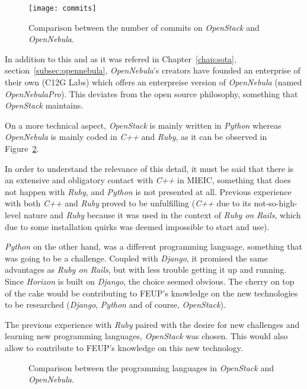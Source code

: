 \begin{figure}[h]
  \begin{center}
    \leavevmode
    \texttt{[image: commits]}
    \caption{Comparison between the number of commits on \textit{OpenStack} and \textit{OpenNebula}.~\cite{ohloh}}
    \label{fig:commits}
  \end{center}
\end{figure}

In addition to this and as it was refered in Chapter~\ref{chap:sota}, section~\ref{subsec:opennebula}, \textit{OpenNebula}'s creators have founded an enterprise of their own (C12G Labs) which offers an enterpreise version of \textit{OpenNebula} (named \textit{OpenNebulaPro}). This deviates from the open source philosophy, something that \textit{OpenStack} maintains.

On a more technical aspect, \textit{OpenStack} is mainly written in \textit{Python} whereas \textit{OpenNebula} is mainly coded in \textit{C++} and \textit{Ruby}, as it can be observed in Figure~\ref{fig:code-stack-nebula}. 

In order to understand the relevance of this detail, it must be said that there is an extensive and obligatory contact with \textit{C++} in MIEIC, something that does not happen with \textit{Ruby}, and \textit{Python} is not presented at all. Previous experience with both \textit{C++} and \textit{Ruby} proved to be unfulfilling (\textit{C++} due to its not-so-high-level nature and \textit{Ruby} because it was used in the context of \textit{Ruby on Rails}, which due to some installation quirks was deemed impossible to start and use). 

\textit{Python} on the other hand, was a different programming language, something that was going to be a challenge. Coupled with \textit{Django}, it promised the same advantages as \textit{Ruby on Rails}, but with less trouble getting it up and running. Since \textit{Horizon} is built on \textit{Django}, the choice seemed obvious. The cherry on top of the cake would be contributing to FEUP's knowledge on the new technologies to be researched (\textit{Django}, \textit{Python} and of course, \textit{OpenStack}).

The previous experience with \textit{Ruby} paired with the desire for new challenges and learning new programming languages, \textit{OpenStack} was chosen. This would also allow to contribute to FEUP's knowledge on this new technology.

\begin{figure}[h!]
  \begin{center}
    \leavevmode
    \caption{Comparison between the programming languages in \textit{OpenStack} and \textit{OpenNebula}.~\cite{ohloh}}
    \label{fig:code-stack-nebula}
  \end{center}
\end{figure}

